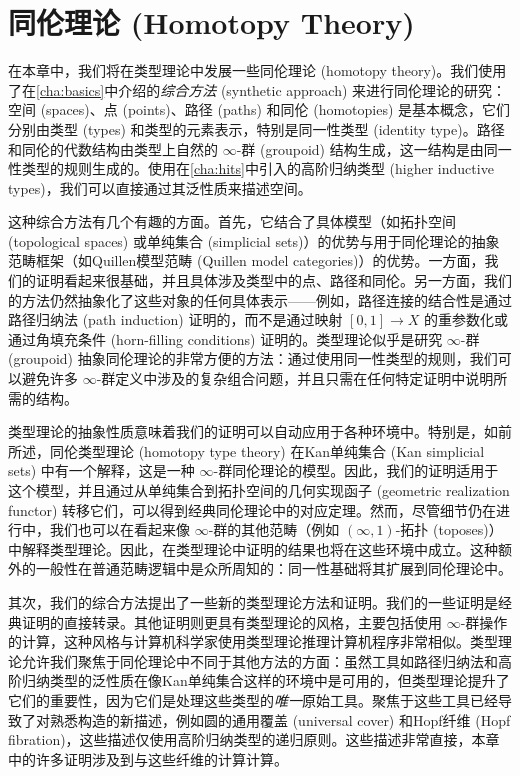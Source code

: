 \chapter{同伦理论 (Homotopy Theory)}
\label{cha:homotopy}


在本章中，我们将在类型理论中发展一些同伦理论 (homotopy theory)。我们使用了在\cref{cha:basics}中介绍的\emph{综合方法} (synthetic approach) 来进行同伦理论的研究：空间 (spaces)、点 (points)、路径 (paths) 和同伦 (homotopies) 是基本概念，它们分别由类型 (types) 和类型的元素表示，特别是同一性类型 (identity type)。路径和同伦的代数结构由类型上自然的 $\infty$-群 (groupoid) 结构生成，这一结构是由同一性类型的规则生成的。使用在\cref{cha:hits}中引入的高阶归纳类型 (higher inductive types)，我们可以直接通过其泛性质来描述空间。

%
这种综合方法有几个有趣的方面。首先，它结合了具体模型（如拓扑空间 (topological spaces) 或单纯集合 (simplicial sets)）的优势与用于同伦理论的抽象范畴框架（如Quillen模型范畴 (Quillen model categories)）的优势。一方面，我们的证明看起来很基础，并且具体涉及类型中的点、路径和同伦。另一方面，我们的方法仍然抽象化了这些对象的任何具体表示——例如，路径连接的结合性是通过路径归纳法 (path induction) 证明的，而不是通过映射 $[0,1] \to X$ 的重参数化或通过角填充条件 (horn-filling conditions) 证明的。类型理论似乎是研究 $\infty$-群 (groupoid) 抽象同伦理论的非常方便的方法：通过使用同一性类型的规则，我们可以避免许多 $\infty$-群定义中涉及的复杂组合问题，并且只需在任何特定证明中说明所需的结构。

类型理论的抽象性质意味着我们的证明可以自动应用于各种环境中。特别是，如前所述，同伦类型理论 (homotopy type theory) 在Kan单纯集合 (Kan simplicial sets) 中有一个解释，这是一种 $\infty$-群同伦理论的模型。因此，我们的证明适用于这个模型，并且通过从单纯集合到拓扑空间的几何实现函子 (geometric realization functor) 转移它们，可以得到经典同伦理论中的对应定理。然而，尽管细节仍在进行中，我们也可以在看起来像 $\infty$-群的其他范畴（例如 $(\infty,1)$-拓扑 (toposes)）中解释类型理论。因此，在类型理论中证明的结果也将在这些环境中成立。这种额外的一般性在普通范畴逻辑中是众所周知的：同一性基础将其扩展到同伦理论中。

其次，我们的综合方法提出了一些新的类型理论方法和证明。我们的一些证明是经典证明的直接转录。其他证明则更具有类型理论的风格，主要包括使用 $\infty$-群操作的计算，这种风格与计算机科学家使用类型理论推理计算机程序非常相似。类型理论允许我们聚焦于同伦理论中不同于其他方法的方面：虽然工具如路径归纳法和高阶归纳类型的泛性质在像Kan单纯集合这样的环境中是可用的，但类型理论提升了它们的重要性，因为它们是处理这些类型的\emph{唯一}原始工具。聚焦于这些工具已经导致了对熟悉构造的新描述，例如圆的通用覆盖 (universal cover) 和Hopf纤维 (Hopf fibration)，这些描述仅使用高阶归纳类型的递归原则。这些描述非常直接，本章中的许多证明涉及到与这些纤维的计算计算。

